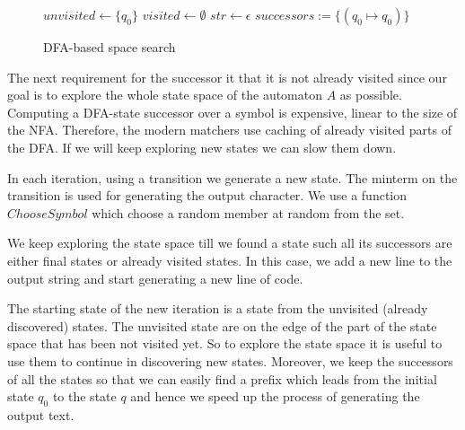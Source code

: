 \documentclass[acmsmall,screen]{acmart}
\begin{document}
 \begin{figure}[t]
\begin{center}
\begin{algorithm}[H]
\caption{DFA-based space search}
\label{algo:basic}
    $unvisited \leftarrow \{q_0\}$\;
    $visited \leftarrow \emptyset$\;
    $str \leftarrow \epsilon$\;
    $successors:=\{ (q_0\mapsto q_0)\}$\;
    
      \label{ln:ret}
\end{algorithm}		
\end{center}
\vspace*{-7mm}
\end{figure}


%
The next requirement for the successor it that it is not already visited since our goal is 
%
to explore the whole state space of the automaton $A$ as possible.
%
Computing a DFA-state successor over a symbol is expensive, linear to the size of the NFA.
%
Therefore, the modern matchers use caching of already visited parts of the DFA. 
%
If we will keep exploring new states we can slow them down.

%
In each iteration, using a transition we generate a new state.
%
The minterm on the transition is used for generating the output character. 
%
We use a function $ChooseSymbol$ which choose a random member at random from the set.
%

We keep exploring the state space till we found a state such all its successors are either final states or already visited states.
%
In this case, we add a new line to the output string and start generating a new line of code.
%

The starting state of the new iteration is a state from the unvisited (already discovered) states. 
%
The unvisited state are on the edge of the part of the state space that has been not visited yet. 
%
So to explore the state space it is useful to use them to continue in discovering new states.
%
Moreover, we keep the successors of all the states so that we can easily find a prefix
%
which leads from the initial state $q_0$ to the state $q$ 
%
and hence we speed up the process of generating the output text.
\end{document}
